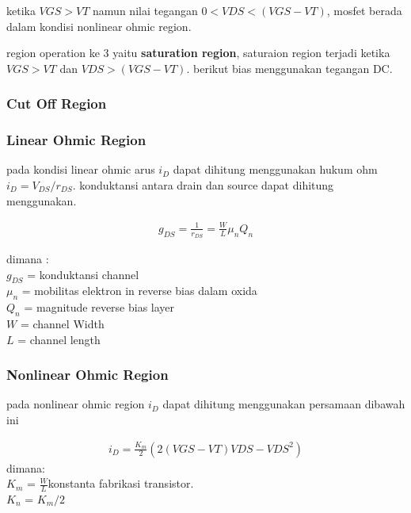 ketika $VGS > VT $ namun nilai tegangan $0< VDS< (VGS - VT)$, mosfet berada dalam kondisi nonlinear
ohmic region.

region operation ke 3 yaitu \textbf{saturation region}, saturaion region terjadi ketika $VGS > VT$ dan 
$VDS > (VGS - VT)$. berikut bias menggunakan tegangan DC.




\subsubsection{Cut Off Region}

\subsubsection{Linear Ohmic Region}
pada kondisi linear ohmic arus $i_D$ dapat dihitung menggunakan hukum ohm $i_D = V_{DS}/r_{DS}$. 
konduktansi antara drain dan source dapat dihitung menggunakan.

\begin{gather}
  g_{DS} = \frac{1}{r_{DS}} = \frac{W}{L} \mu_n Q_n
\end{gather}
 
dimana :\\
$g_{DS}$ = konduktansi channel\\
$\mu_n$ = mobilitas elektron in reverse bias dalam oxida\\
$Q_n$ = magnitude reverse bias layer\\
$W$ = channel Width\\
$L$ = channel length\\


\subsubsection{Nonlinear Ohmic Region}
pada nonlinear ohmic region $i_D$ dapat dihitung menggunakan persamaan dibawah ini

\begin{gather}
  i_D = \frac{K_m}{2} (2(VGS-VT)VDS - VDS^2)
\end{gather}
dimana: \\
$K_m$ = $\frac{W}{L}$konstanta fabrikasi transistor.\\
$K_n$ = $K_m/2$\\


